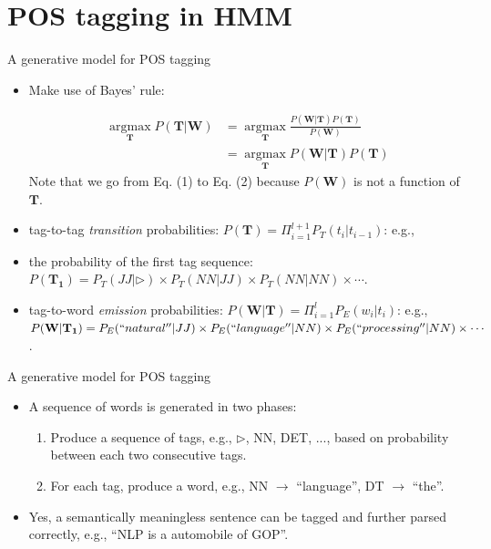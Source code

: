 \documentclass[11pt, handout]{beamer}
\newcommand{\argmaxF}{\mathop{\mathrm{argmax}}\limits}
\begin{document}
\section{POS tagging in HMM}

\begin{frame}{A generative model for POS tagging}
\begin{itemize}[<+->]


 \item Make use of Bayes' rule:

 \begin{align}
\argmaxF_\mathbf{T}  P(\mathbf{T}|\mathbf{W}) &= \argmaxF_\mathbf{T} \frac{P(\mathbf{W}|\mathbf{T}) P(\mathbf{T}) }{P(\mathbf{W})}  \\
       &= \argmaxF_\mathbf{T} P(\mathbf{W}|\mathbf{T}) P(\mathbf{T}) 
\end{align}
{\tiny Note that we go from Eq. (1) to Eq. (2) because $P(\mathbf{W})$ is not a function of $\mathbf{T}$.}

 \item tag-to-tag \textit{transition} probabilities: $P(\mathbf{T}) = \Pi_{i=1}^{l+1} P_T(t_i | t_{i-1}) $: e.g., \item the probability of the first tag sequence: $P(\mathbf{T_1}) = P_T(JJ|\rhd) \times P_T(NN|JJ)   \times P_T(NN|NN)  \times \cdots $.
 
 \item tag-to-word \textit{emission} probabilities: $P(\mathbf{W}|\mathbf{T}) = \Pi_{i=1}^{l} P_E(w_i|t_i) $: e.g., $ P(\mathbf{W}|\mathbf{T_1}) = P_E(``natural''|JJ) \times P_E(``language''|NN)  \times P_E(``processing''|NN)   \times \cdots $.

\end{itemize}
\end{frame}

\begin{frame}{A generative model for POS tagging}
  \begin{itemize}[<+->]
   \item A sequence of words is generated in two phases:
   \begin{enumerate}
    \item Produce a sequence of tags, e.g., $\rhd$, NN, DET, ..., based on probability between each two consecutive tags. 
    \item For each tag, produce a word, e.g., NN $\rightarrow$ ``language'', DT $\rightarrow$ ``the''. 
   \end{enumerate}
  
    \item Yes, a semantically meaningless sentence can be tagged and further parsed correctly,  e.g., ``NLP is a automobile of GOP''.
  \end{itemize}
  \end{frame}
\end{document}
